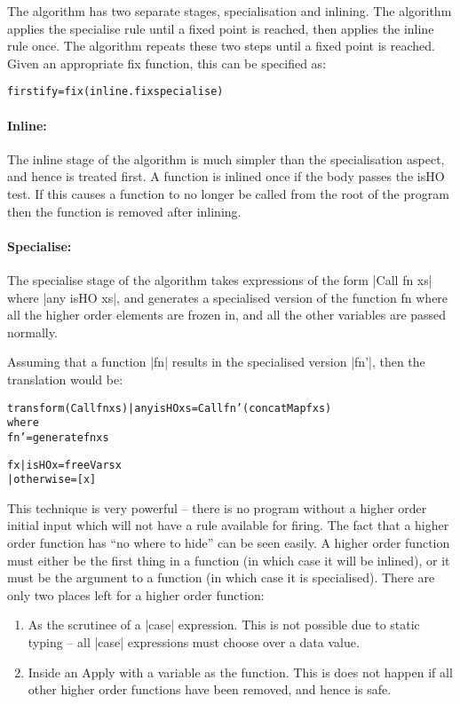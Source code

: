 \documentclass[preprint]{sigplanconf}
\newcommand{\C}[1]{\textsf{#1}}
\newenvironment{code}{\begin{alltt}\small}{\end{alltt}}
\begin{document}
The algorithm has two separate stages, specialisation and inlining. The algorithm applies the specialise rule until a fixed point is reached, then applies the inline rule once. The algorithm repeats these two steps until a fixed point is reached. Given an appropriate \C{fix} function, this can be specified as:

\begin{code}
firstify = fix (inline . fix specialise)
\end{code}

\paragraph{Inline:} The \C{inline} stage of the algorithm is much simpler than the specialisation aspect, and hence is treated first. A function is inlined once if the body passes the \C{isHO} test. If this causes a function to no longer be called from the root of the program then the function is removed after inlining.

\paragraph{Specialise:} The \C{specialise} stage of the algorithm takes expressions of the form |Call fn xs| where |any isHO xs|, and generates a specialised version of the function \C{fn} where all the higher order elements are frozen in, and all the other variables are passed normally.

Assuming that a function |fn| results in the specialised version |fn'|, then the translation would be:

\begin{code}
transform (Call fn xs) | any isHO xs = Call fn' (concatMap f xs)
    where
    fn' = generate fn xs

    f x  | isHO x     = freeVars x
         | otherwise  = [x]
\end{code}

This technique is very powerful -- there is no program without a higher order initial input which will not have a rule available for firing. The fact that a higher order function has ``no where to hide'' can be seen easily. A higher order function must either be the first thing in a function (in which case it will be inlined), or it must be the argument to a function (in which case it is specialised). There are only two places left for a higher order function:

\begin{enumerate}
\item As the scrutinee of a |case| expression. This is not possible due to static typing -- all |case| expressions must choose over a data value.

\item Inside an \C{Apply} with a variable as the function. This is does not happen if all other higher order functions have been removed, and hence is safe.
\end{enumerate}
\end{document}
